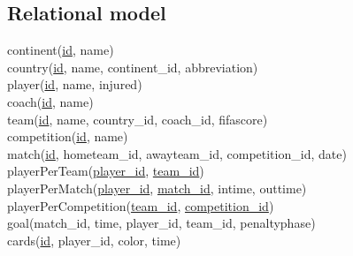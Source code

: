 \documentclass[11pt, a4paper]{article}
\begin{document}
\subsection{Relational model}
continent(\uline{id}, name) \\
country(\uline{id}, name, continent\_id, abbreviation) \\
player(\uline{id}, name, injured) \\
coach(\uline{id}, name) \\
team(\uline{id}, name, country\_id, coach\_id, fifascore) \\
competition(\uline{id}, name) \\
match(\uline{id}, hometeam\_id, awayteam\_id, competition\_id, date) \\
playerPerTeam(\uline{player\_id}, \uline{team\_id}) \\
playerPerMatch(\uline{player\_id}, \uline{match\_id}, intime, outtime) \\
playerPerCompetition(\uline{team\_id}, \uline{competition\_id}) \\
goal(match\_id, time, player\_id, team\_id, penaltyphase) \\
cards(\uline{id}, player\_id, color, time) \\
\end{document}
